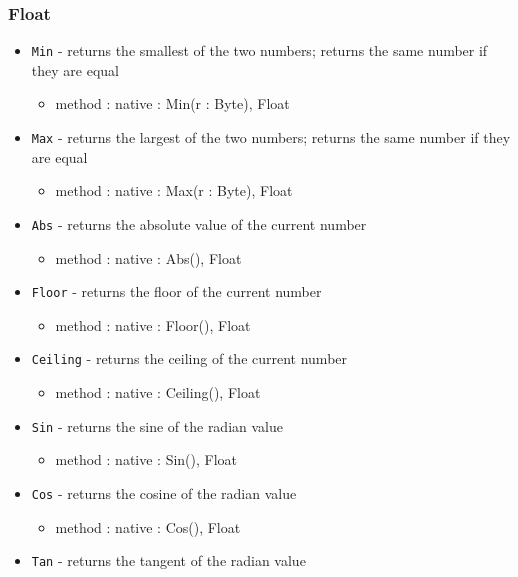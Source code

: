 \documentclass[12pt]{article}
\begin{document}
\subsubsection{Float}
\begin{itemize}
    \item \texttt{Min} - returns the smallest of the two numbers; returns the same number if they are equal
    	\begin{itemize}
	\item method : native : Min(r : Byte), Float
	\end{itemize}
    \item \texttt{Max} - returns the largest of the two numbers; returns the same number if they are equal
    	\begin{itemize}
	\item method : native : Max(r : Byte), Float
	\end{itemize}
    \item \texttt{Abs} - returns the absolute value of the current number
    	\begin{itemize}
	\item method : native : Abs(), Float
	\end{itemize}
    \item \texttt{Floor} - returns the floor of the current number
    	\begin{itemize}
	\item method : native : Floor(), Float
	\end{itemize}
    \item \texttt{Ceiling} - returns the ceiling of the current number
    	\begin{itemize}
	\item method : native : Ceiling(), Float
	\end{itemize}
    \item \texttt{Sin} - returns the sine of the radian value
    	\begin{itemize}
	\item method : native : Sin(), Float
	\end{itemize}
    \item \texttt{Cos} - returns the cosine of the radian value
    	\begin{itemize}
	\item method : native : Cos(), Float
	\end{itemize}
    \item \texttt{Tan} - returns the tangent of the radian value
    	\begin{itemize}

\end{itemize}
\end{itemize}
\end{document}
